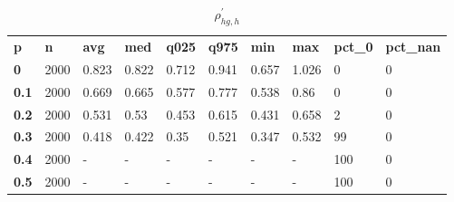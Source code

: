 \begin{table}[h]
 \centering 
\footnotesize
\caption{$\rho_{hg,h}^\prime $}
\label{tab:alphahgh}
\begin{tabular}[h]{| l l l l l l l l l l|
    } \hline
\textbf{ p} & \textbf{ n} & \textbf{ avg} & \textbf{ med} & \textbf{ q025} & \textbf{ q975} & \textbf{ min} & \textbf{ max} & \textbf{ pct\_0} & \textbf{ pct\_nan}
           \\
  \textbf{  0} & 2000 & 0.823 & 0.822 & 0.712 & 0.941 & 0.657 & 1.026 &   0 & 0
           \\
  \textbf{0.1} & 2000 & 0.669 & 0.665 & 0.577 & 0.777 & 0.538 &  0.86 &   0 & 0
           \\
  \textbf{0.2} & 2000 & 0.531 &  0.53 & 0.453 & 0.615 & 0.431 & 0.658 &   2 & 0
           \\
  \textbf{0.3} & 2000 & 0.418 & 0.422 &  0.35 & 0.521 & 0.347 & 0.532 &  99 & 0
           \\
  \textbf{0.4} & 2000 & - & - & - & - & - & - & 100 & 0
           \\
  \textbf{0.5} & 2000 & - & - & - & - & - & - & 100 & 0
           \\
 \hline \end{tabular}
 \end{table}
